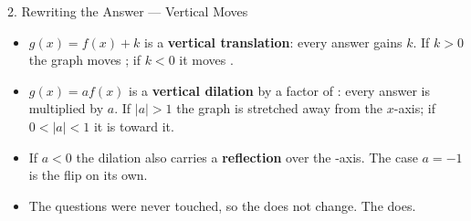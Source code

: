 \documentclass[10pt]{article}
\begin{document}
\begin{notesbox}{2. Rewriting the Answer --- Vertical Moves}
\begin{itemize}[itemsep=4pt]
  \item $g(x) = f(x) + k$ is a \textbf{vertical translation}: every answer
        gains $k$. If $k > 0$ the graph moves \blank{1.4cm}; if $k < 0$ it
        moves \blank{1.4cm}.
  \item $g(x) = af(x)$ is a \textbf{vertical dilation} by a factor of
        \blank{1.4cm}: every answer is multiplied by $a$. If $|a| > 1$ the
        graph is stretched away from the $x$-axis; if $0 < |a| < 1$ it is
        \blank{2.4cm} toward it.
  \item If $a < 0$ the dilation also carries a \textbf{reflection} over the
        \blank{1.6cm}-axis. The case $a = -1$ is the flip on its own.
  \item The questions were never touched, so the \blank{2cm} does not change.
        The \blank{1.6cm} does.
\end{itemize}
\end{notesbox}

\vspace{0.1in}
\end{document}

